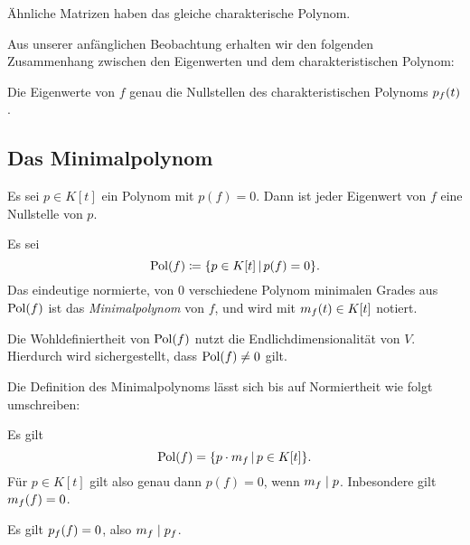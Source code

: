 \begin{lemma}
  Ähnliche Matrizen haben das gleiche charakterische Polynom.
\end{lemma}

Aus unserer anfänglichen Beobachtung erhalten wir den folgenden Zusammenhang zwischen den Eigenwerten und dem charakteristischen Polynom:

\begin{proposition}
  Die Eigenwerte von $f$ genau die Nullstellen des charakteristischen Polynoms $p_{f}(t)$.
\end{proposition}





\subsection{Das Minimalpolynom}

\begin{lemma}
  \label{lemma: polynomial equations give restriction for the eigenvalues}
  Es sei $p \in K[t]$ ein Polynom mit $p(f) = 0$.
  Dann ist jeder Eigenwert von $f$ eine Nullstelle von $p$.
\end{lemma}

\begin{definition}
  Es sei
  \[
              \operatorname{Pol}(f)
    \coloneqq \{ p \in K[t] \,|\, p(f) = 0 \}.
  \]
  Das eindeutige normierte, von $0$ verschiedene Polynom minimalen Grades aus $\operatorname{Pol}(f)$ ist das \emph{Minimalpolynom} von $f$, und wird mit $m_{f}(t) \in K[t]$ notiert.
\end{definition}

\begin{remark}
  Die Wohldefiniertheit von $\operatorname{Pol}(f)$ nutzt die Endlichdimensionalität von $V$.
  Hierdurch wird sichergestellt, dass $\operatorname{Pol}(f) \neq 0$ gilt.
\end{remark}

Die Definition des Minimalpolynoms lässt sich bis auf Normiertheit wie folgt umschreiben:

\begin{lemma}
  \label{lemma: properties of the minimal polynomial}
  Es gilt
  \[
      \operatorname{Pol}(f)
    = \{ p \cdot m_{f} \,|\, p \in K[t] \}.
  \]
  Für $p \in K[t]$ gilt also genau dann $p(f) = 0$, wenn $m_{f} \mid p$.
  Inbesondere gilt $m_{f}(f) = 0$.
\end{lemma}

\begin{theorem}
  Es gilt $p_{f}(f) = 0$, also $m_{f} \mid p_{f}$.
\end{theorem}

